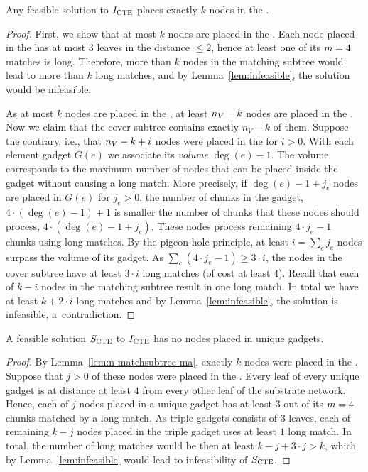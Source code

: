   
\begin{lemma}
  Any feasible solution to $I_{\mathrm{\textsc{CTE}}}$ places exactly $k$ nodes in the \MatchSubtree.
  \label{lem:n-matchsubtree-ma}
\end{lemma}

\begin{proof}
  First, we show that at most $k$ nodes are placed in the \MatchSubtree.
  Each node placed in the \MatchSubtree{} has at most $3$ leaves in the distance $\leq 2$, hence at least one of its $m=4$ matches is long.
  Therefore, more than $k$ nodes in the matching subtree would lead to more than $k$ long matches, and by Lemma~\ref{lem:infeasible}, the solution would be infeasible.
  
  As at most $k$ nodes are placed in the \MatchSubtree{}, at least $n_V-k$ nodes are placed in the \CoverSubtree.
  Now we claim that the cover subtree contains exactly $n_V-k$ of them.
  Suppose the contrary, i.e., that $n_V-k+i$ nodes were placed in the \CoverSubtree{} for $i > 0$.
  With each element gadget $G(e)$ we associate its \emph{volume} $\deg(e) - 1$.
  The volume corresponds to the maximum number of nodes that can be placed inside the gadget without causing a long match.
  More precisely, if $\deg(e) - 1 + j_e$ nodes are placed in $G(e)$ for $j_e > 0$, the number of chunks in the gadget, $4\cdot (\deg(e)-1)+1$ is smaller the number of chunks that these nodes should process, $4 \cdot (\deg(e)-1+j_e)$.
  These nodes process remaining $4\cdot j_e - 1$ chunks using long matches.
  By the pigeon-hole principle, at least $i = \sum_e j_e$ nodes surpass the volume of its gadget.
  As $\sum_e (4\cdot j_e - 1) \geq 3 \cdot i$, the nodes in the cover subtree have at least $3\cdot i$ long matches (of cost at least $4$).
  Recall that each of $k-i$ nodes in the matching subtree result in one long match.
  In total we have at least $k+2\cdot i$ long matches and by Lemma~\ref{lem:infeasible}, the solution is infeasible, a~contradiction.
\end{proof}

\begin{lemma}
  A feasible solution $S_{\mathrm{\textsc{CTE}}}$ to $I_{\mathrm{\textsc{CTE}}}$ has no nodes placed in unique gadgets.
  \label{lem:no-unq-ma}
\end{lemma}
\begin{proof}
  By Lemma~\ref{lem:n-matchsubtree-ma}, exactly $k$ nodes were placed in the \MatchSubtree{}.
  Suppose that $j>0$ of these nodes were placed in the \UnqGadgets{}.
  Every leaf of every unique gadget is at distance at least $4$ from every other leaf of the substrate network.
  Hence, each of $j$ nodes placed in a unique gadget has at least $3$ out of its $m = 4$ chunks matched by a long match.
  As triple gadgets consists of $3$ leaves, each of remaining $k-j$ nodes placed in the triple gadget uses at least $1$ long match.
  In total, the number of long matches would be then at least $k-j + 3\cdot j > k$, which by Lemma~\ref{lem:infeasible} would lead to infeasibility of $S_{\mathrm{\textsc{CTE}}}$.
\end{proof}

